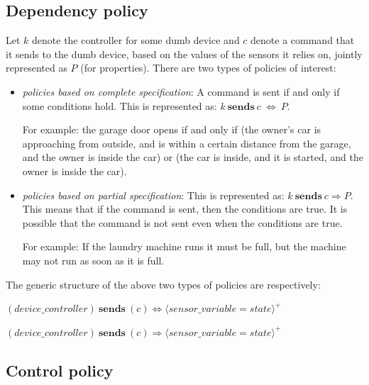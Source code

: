 \documentclass{article}
\begin{document}
\subsection{Dependency policy}
\label{subsec:dep}
Let $k$ denote the controller for some dumb device and $c$ denote a command that it sends to the dumb device, based on the values of the sensors it relies on, jointly represented as $P$ (for properties). 
There are two types of policies of interest:
\begin{itemize}
\item \textit {policies based on complete specification}: A command is sent if and only if some conditions hold. This is represented as: $k ~\textbf{sends}~ c~\Leftrightarrow~P$.  

For example:
the garage door opens if and only if (the owner's car is approaching from outside, and is within a certain distance from the garage, and the owner is inside the car) or (the car is inside, and it is started, and the owner is inside the car).

\item \textit {policies based on partial specification}:  This is represented as: $k ~\textbf{sends}~ c \Rightarrow P$. This means that if the command is sent, then the conditions are true. It is possible that the command is not sent even when the conditions are true. 

For example: If the laundry machine runs it must be full, but the machine may not run as soon as it is full.
\end{itemize}
The generic structure of the above two types of policies are respectively:

\hspace{2cm}$(device\_controller) ~\textbf{sends}~(c) \Leftrightarrow \langle \mathit{sensor\_variable = state}\rangle^{+}$ 

\hspace{2cm}$(device\_controller) ~\textbf{sends}~(c) \Rightarrow \langle \mathit{sensor\_variable = state}\rangle^{+}$ \\

\subsection{Control policy}
\label{subsec:control}
\end{document}
